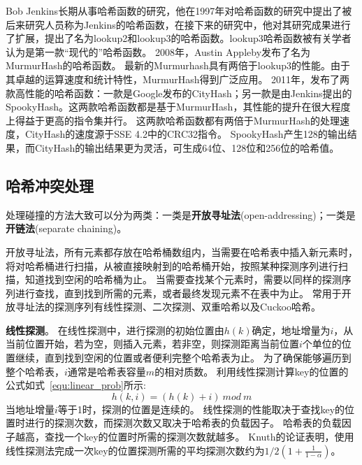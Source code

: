 Bob Jenkins长期从事哈希函数的研究，他在1997年对哈希函数的研究中提出了被后来研究人员称为Jenkins的哈希函数\cite{jenkins1997hash}，在接下来的研究中，他对其研究成果进行了扩展，提出了名为lookup2和lookup3的哈希函数\cite{jenkins2006function}。lookup3哈希函数被有关学者认为是第一款“现代的”哈希函数。
2008年，Austin Appleby发布了名为MurmurHash的哈希函数\cite{Murmurhash}。
最新的Murmurhash具有两倍于lookup3的性能。由于其卓越的运算速度和统计特性，MurmurHash得到广泛应用。
2011年，发布了两款高性能的哈希函数：一款是Google发布的CityHash\cite{cityhash}；另一款是由Jenkins提出的SpookyHash\cite{jenkins2012spookyhash}。这两款哈希函数都是基于MurmurHash，其性能的提升在很大程度上得益于更高的指令集并行。
这两款哈希函数都有两倍于MurmurHash的处理速度，CityHash的速度源于SSE 4.2中的CRC32指令。
SpookyHash产生128的输出结果，而CityHash的输出结果更为灵活，可生成64位、128位和256位的哈希值。

\subsection{哈希冲突处理}

处理碰撞的方法大致可以分为两类：一类是\textbf{开放寻址法}(open-addressing)；一类是\textbf{开链法}(separate chaining)。

开放寻址法，所有元素都存放在哈希桶数组内，当需要在哈希表中插入新元素时，将对哈希桶进行扫描，从被直接映射到的哈希桶开始，按照某种探测序列进行扫描，知道找到空闲的哈希桶为止。
当需要查找某个元素时，需要以同样的探测序列进行查找，直到找到所需的元素，或者最终发现元素不在表中为止。
常用于开放寻址法的探测序列有线性探测、二次探测、双重哈希以及Cuckoo哈希。

\textbf{线性探测}。
在线性探测中，进行探测的初始位置由$h(k)$确定，地址增量为$i$，从当前位置开始，若为空，则插入元素，若非空，则探测距离当前位置$i$个单位的位置继续，直到找到空闲的位置或者便利完整个哈希表为止。
为了确保能够遍历到整个哈希表，$i$通常是哈希表容量$m$的相对质数。
利用线性探测计算key的位置的公式如式~\ref{equ:linear_prob}所示:
\begin{equation}
	h(k,i) = (h(k)+i) ~{mod}~m
\label{equ:linear_prob}
\end{equation}
当地址增量$i$等于1时，探测的位置是连续的。
线性探测的性能取决于查找key的位置时进行的探测次数，而探测次数又取决于哈希表的负载因子。
哈希表的负载因子越高，查找一个key的位置时所需的探测次数就越多。
Knuth的论证表明\cite{knuth1998art}，使用线性探测法完成一次key的位置探测所需的平均探测次数约为$1/2(1+\frac{1}{1-\alpha})$。


